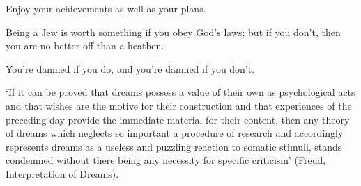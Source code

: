 \begin{enumerate}
\begin{statement}{Enjoy your achievements as well as your plans.}
\end{statement}

\begin{statement}{Being a Jew is worth something if you obey God’s laws; but if you don’t, then you are no better off than a heathen.}
\end{statement}

\begin{statement}{You’re damned if you do, and you’re damned if you don’t.}
\end{statement}

\begin{statement}{‘If it can be proved that dreams possess a value of their own
    as psychological acts and that wishes are the motive for their construction
    and that experiences of the preceding day provide the immediate material for
    their content, then any theory of dreams which neglects so important a
    procedure of research and accordingly represents dreams as a useless and
    puzzling reaction to somatic stimuli, stands condemned without there being
    any necessity for specific criticism’ (Freud, Interpretation of Dreams).}
\end{statement}

\end{enumerate}
% 
